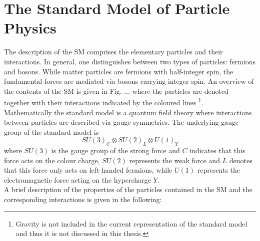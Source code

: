 \section{The Standard Model of Particle Physics}
\label{sec:sm}
The description of the SM comprises the elementary particles and their interactions. In general, one distinguishes between two types of particles: fermions and bosons. While matter particles are fermions with half-integer spin, the fundamental forces are mediated via bosons carrying integer spin. An overview of the contents of the SM is given in Fig. ... where the particles are denoted together with their interactions indicated by the coloured lines \footnote{Gravity is not included in the current representation of the standard model and thus it is not discussed in this thesis.}. \\
Mathematically the standard model is a quantum field theory where interactions between particles are described via gauge symmetries. The underlying gauge group of the standard model is 
\begin{equation*}
SU(3)_{C} \otimes SU(2)_{L} \otimes U(1)_{Y}
\end{equation*}
where $SU(3)$ is the gauge group of the strong force and $C$ indicates that this force acts on the colour charge, $SU(2)$ represents the weak force and $L$ denotes that this force only acts on left-handed fermions, while $U(1)$ represents the electromagnetic force acting on the hypercharge $Y$.\\
A brief description of the properties of the particles contained in the SM and the corresponding interactions is given in the following:
